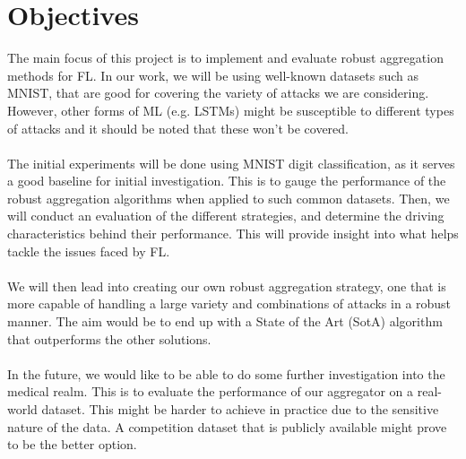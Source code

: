 \section{Objectives}
The main focus of this project is to implement and evaluate robust aggregation methods for FL.
In our work, we will be using well-known datasets such as MNIST, that are good for covering the variety of attacks we are considering.
However, other forms of ML (e.g. LSTMs) might be susceptible to different types of attacks and it should be noted that these won't be covered.
\\ \\
The initial experiments will be done using MNIST \cite{mnist} digit classification, as it serves a good baseline for initial investigation.  This is to gauge the performance of the robust aggregation algorithms when applied to such common datasets.
Then, we will conduct an evaluation of the different strategies, and determine the driving characteristics behind their performance. This will provide insight into what helps tackle the issues faced by FL.
\\ \\
We will then lead into creating our own robust aggregation strategy, one that is more capable of handling a large variety and combinations of attacks in a robust manner.
The aim would be to end up with a State of the Art (SotA) algorithm that outperforms the other solutions.
\\ \\
In the future, we would like to be able to do some further investigation into the medical realm. This is to evaluate the performance of our aggregator on a real-world dataset.
This might be harder to achieve in practice due to the sensitive nature of the data. A competition dataset that is publicly available might prove to be the better option.




